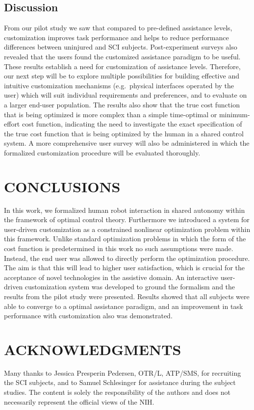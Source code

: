 \documentclass[letterpaper, 10 pt, journal, twoside]{IEEEtran}  %
\begin{document}
	\subsection{Discussion}
	From our pilot study we saw that compared to pre-defined assistance levels, customization improves task performance and helps to reduce performance differences between uninjured and SCI subjects. Post-experiment surveys also revealed that the users found the customized assistance paradigm to be useful. These results establish a need for customization of assistance levels. Therefore, our next step will be to explore multiple possibilities for building effective and intuitive customization mechanisms (e.g.~physical interfaces operated by the user) which will suit individual requirements and preferences, and to evaluate on a larger end-user population. The results also show that the true cost function that is being optimized is more complex than a simple time-optimal or minimum-effort cost function, indicating the need to investigate the exact specification of the true cost function that is being optimized by the human in a shared control system. A more comprehensive user survey will also be administered in which the formalized customization procedure will be evaluated thoroughly.
	\section{CONCLUSIONS}\label{CON}
	In this work, we formalized human robot interaction in shared autonomy within the framework of optimal control theory. Furthermore we introduced a system for user-driven customization as a constrained nonlinear optimization problem within this framework. Unlike standard optimization problems in which the form of the cost function is predetermined in this work no such assumptions were made. Instead, the end user was allowed to directly perform the optimization procedure. The aim is that this will lead to higher user satisfaction, which is crucial for the acceptance of novel technologies in the assistive domain. An interactive user-driven customization system was developed to ground the formalism and the results from the pilot study were presented. Results showed that all subjects were able to converge to a optimal assistance paradigm, and an improvement in task performance with customization also was demonstrated.
	\section*{ACKNOWLEDGMENTS}\label{ACK}
	Many thanks to Jessica Presperin Pedersen, OTR/L,
	ATP/SMS, for recruiting the SCI subjects, and to Samuel
	Schlesinger for assistance during the subject studies. The content is solely
	the responsibility of the authors and does not necessarily
	represent the official views of the NIH.
	
\balance	


\end{document}

